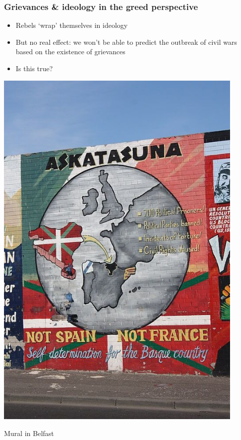 \documentclass[utf8, xcolor=dvipsnames]{beamer}
\begin{document}
\begin{frame}
\frametitle{Grievances \& ideology in the greed perspective}
\centering

\begin{minipage}{0.55\textwidth}\centering
\begin{itemize}[<+->]
  \item Rebels `wrap' themselves in ideology
  \item But no real effect: we won't be able to predict the outbreak of civil wars based on the existence of grievances
  \item Is this true?
\end{itemize}
\end{minipage}\hfill
\begin{minipage}{0.44\textwidth}\centering
  \includegraphics[width = 0.9\textwidth]{img/belfast_mural}

  {\small Mural in Belfast}
\end{minipage}

\end{frame}
\end{document}
